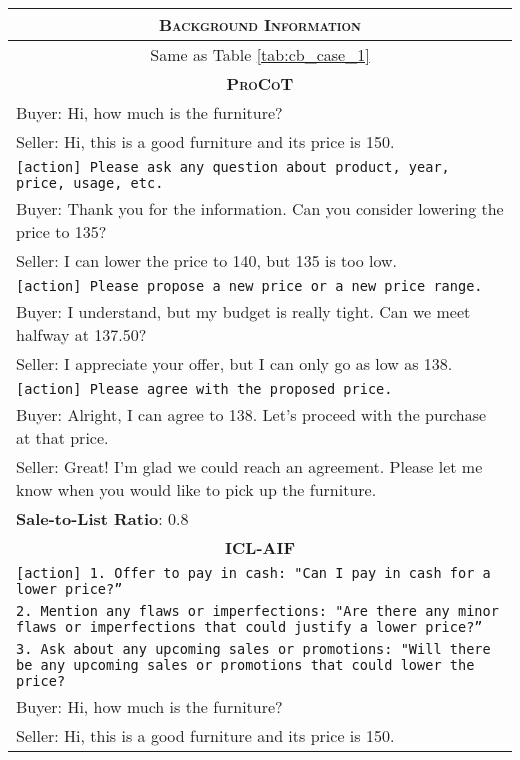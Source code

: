 \begin{table}[]
    \centering
    \begin{tabular}{p{13.5cm}}
    \toprule
    \multicolumn{1}{c}{\textsc{\textbf{Background Information}}}\\
    \midrule
    \multicolumn{1}{c}{Same as Table \ref{tab:cb_case_1}}\\
    \midrule
    \midrule
    \multicolumn{1}{c}{\textsc{\textbf{ProCoT}}}\\
    \midrule
    Buyer: Hi, how much is the furniture?\\
    Seller: Hi, this is a good furniture and its price is 150.\\
    \texttt{[action] Please ask any question about product, year, price, usage, etc.}\\
    Buyer: Thank you for the information. Can you consider lowering the price to 135?\\
    Seller: I can lower the price to 140, but 135 is too low.\\
    \texttt{[action] Please propose a new price or a new price range.}\\
    Buyer: I understand, but my budget is really tight. Can we meet halfway at 137.50?\\
    Seller: I appreciate your offer, but I can only go as low as 138.\\
    \texttt{[action] Please agree with the proposed price.}\\
    Buyer: Alright, I can agree to 138. Let's proceed with the purchase at that price.\\
    Seller: Great! I'm glad we could reach an agreement. Please let me know when you would like to pick up the furniture. \\
    \midrule
    \textbf{Sale-to-List Ratio}: 0.8 \\
    \midrule
    \midrule
    \multicolumn{1}{c}{\textsc{\textbf{ICL-AIF}}}\\
    \midrule
    \texttt{[action] 1. Offer to pay in cash: "Can I pay in cash for a lower price?”} \\
    \texttt{2. Mention any flaws or imperfections: "Are there any minor flaws or imperfections that could justify a lower price?”} \\
    \texttt{3. Ask about any upcoming sales or promotions: "Will there be any upcoming sales or promotions that could lower the price?} \\
    Buyer: Hi, how much is the furniture? \\
Seller: Hi, this is a good furniture and its price is 150.\\

\end{tabular}
\end{table}

